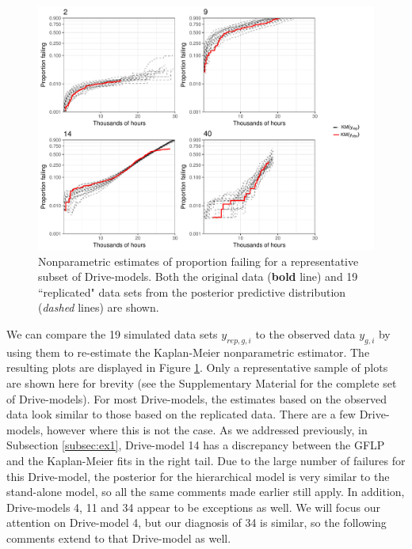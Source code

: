 \documentclass[12pt]{article}
\begin{document}
\begin{figure}[H]
\includegraphics[width=\textwidth]{ppcheck-sample}
\caption{Nonparametric estimates of proportion failing for a representative subset of Drive-models. Both the original data (\textbf{bold} line) and 19 ``replicated" data sets from the posterior predictive distribution (\textit{dashed} lines) are shown.}
\label{fig:post-pred-KM}
\end{figure}

We can compare the 19 simulated data sets $y_{rep,g, i}$ to the observed data $y_{g,i}$ by using them to re-estimate the Kaplan-Meier nonparametric estimator. The resulting plots are displayed in Figure \ref{fig:post-pred-KM}. Only a representative sample of plots are shown here for brevity (see the Supplementary Material for the complete set of Drive-models).  For most Drive-models, the estimates based on the observed data look similar to those based on the replicated data.  There are a few Drive-models, however where this is not the case. As we addressed previously, in Subsection \ref{subsec:ex1}, Drive-model 14 has a discrepancy between the GFLP and the Kaplan-Meier fits in the right tail. Due to the large number of failures for this Drive-model, the posterior for the hierarchical model is very similar to the stand-alone model, so all the same comments made earlier still apply. In addition, Drive-models 4, 11 and 34 appear to be exceptions as well. We will focus our attention on Drive-model 4, but our diagnosis of 34 is similar, so the following comments extend to that Drive-model as well.
\end{document}
